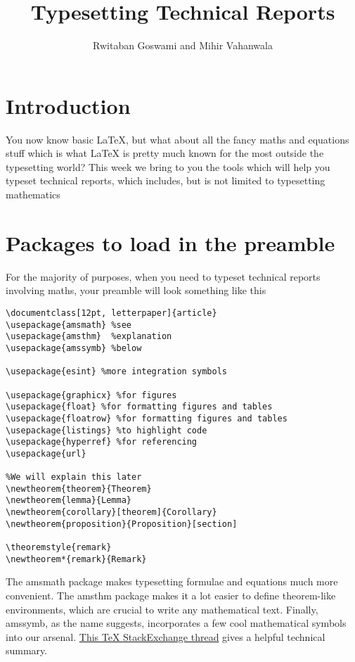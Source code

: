 \documentclass[12pt, letterpaper]{article}
\theoremstyle{remark}
\begin{document}
\title{\vspace{-2em}Typesetting Technical Reports}
\author{Rwitaban Goswami and Mihir Vahanwala}
\maketitle

\tableofcontents

\newpage
\section{Introduction}
You now know basic \LaTeX{}, but what about all the fancy maths and equations stuff which is what \LaTeX{} is pretty much known for the most outside the typesetting world? This week we bring to you the tools which will help you typeset technical reports, which includes, but is not limited to typesetting mathematics

\section{Packages to load in the preamble}
For the majority of purposes, when you need to typeset technical reports involving maths, your preamble will look something like this
\begin{lstlisting}
\documentclass[12pt, letterpaper]{article}
\usepackage{amsmath} %see
\usepackage{amsthm}  %explanation
\usepackage{amssymb} %below

\usepackage{esint} %more integration symbols

\usepackage{graphicx} %for figures
\usepackage{float} %for formatting figures and tables
\usepackage{floatrow} %for formatting figures and tables
\usepackage{listings} %to highlight code
\usepackage{hyperref} %for referencing
\usepackage{url}

%We will explain this later
\newtheorem{theorem}{Theorem}
\newtheorem{lemma}{Lemma}
\newtheorem{corollary}[theorem]{Corollary}
\newtheorem{proposition}{Proposition}[section]

\theoremstyle{remark}
\newtheorem*{remark}{Remark}
\end{lstlisting}

The amsmath package makes typesetting formulae and equations much more convenient. The amsthm package makes it a lot easier to define theorem-like environments, which are crucial to write any mathematical text. Finally, amssymb, as the name suggests, incorporates a few cool mathematical symbols into our arsenal. \href{https://tex.stackexchange.com/questions/32100/what-does-each-ams-package-do}{This TeX StackExchange thread} gives a helpful technical summary. \cite{ams-packages} 
\end{document}
